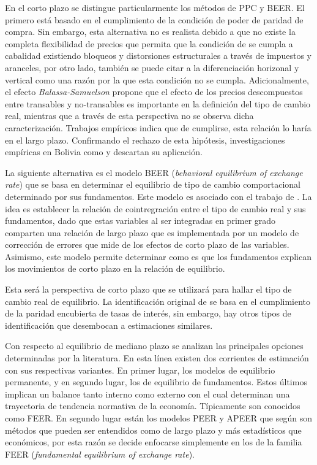\documentclass[12pt,letterpaper]{article}
\begin{document}
En el corto plazo se distingue particularmente los métodos de PPC y BEER. El primero está basado en el cumplimiento de la condición de poder de paridad de compra. Sin embargo, esta alternativa no es realista debido a que no existe la completa flexibilidad de precios que permita que la condición de se cumpla a cabalidad existiendo bloqueos y distorsiones estructurales a través de impuestos y aranceles, por otro lado, también se puede citar a la diferenciación horizonal y vertical como una razón por la que esta condición no se cumpla. Adicionalmente, el efecto \emph{Balassa-Samuelson} propone que el efecto de los precios descompuestos entre transables y no-transables \citep{balassa1968effective} es importante en la definición del tipo de cambio real, mientras que a través de esta perspectiva no se observa dicha caracterización. Trabajos empíricos indica que de cumplirse, esta relación lo haría en el largo plazo. Confirmando el rechazo de esta hipótesis, investigaciones empíricas en Bolivia como \cite{lora2000tipo} y \cite{humerez2005reexaminando} descartan su aplicación.

La siguiente alternativa es el modelo BEER (\emph{behavioral equilibrium of exchange rate}) que se basa en determinar el equilibrio de tipo de cambio comportacional determinado por sus fundamentos. Este modelo es asociado con el trabajo de \cite{clark1999exchange}. La idea es establecer la relación de cointregración entre el tipo de cambio real y sus fundamentos, dado que estas variables al ser integradas en primer grado comparten una relación de largo plazo que es implementada por un modelo de corrección de errores que mide de los efectos de corto plazo de las variables. Asimismo, este modelo permite determinar como es que los fundamentos explican los movimientos de corto plazo en la relación de equilibrio.

Esta será la perspectiva de corto plazo que se utilizará para hallar el tipo de cambio real de equilibrio. La identificación original de \cite{clark1999exchange} se basa en el cumplimiento de la paridad encubierta de tasas de interés, sin embargo, hay otros tipos de identificación que desembocan a estimaciones similares.

Con respecto al equilibrio de mediano plazo se analizan las principales opciones determinadas por la literatura. En esta línea existen dos corrientes de estimación con sus respectivas variantes. En primer lugar, los modelos de equilibrio permanente, y en segundo lugar, los de equilibrio de fundamentos. Estos últimos implican un balance tanto interno como externo con el cual determinan una trayectoria de tendencia normativa de la economía. Típicamente son conocidos como FEER. En segundo lugar están los modelos PEER y APEER que según \cite{driver2005concepts} son métodos que pueden ser entendidos como de largo plazo y más estadísticos que económicos, por esta razón se decide enfocarse simplemente en los de la familia FEER (\emph{fundamental equilibrium of exchange rate}).
\end{document}
